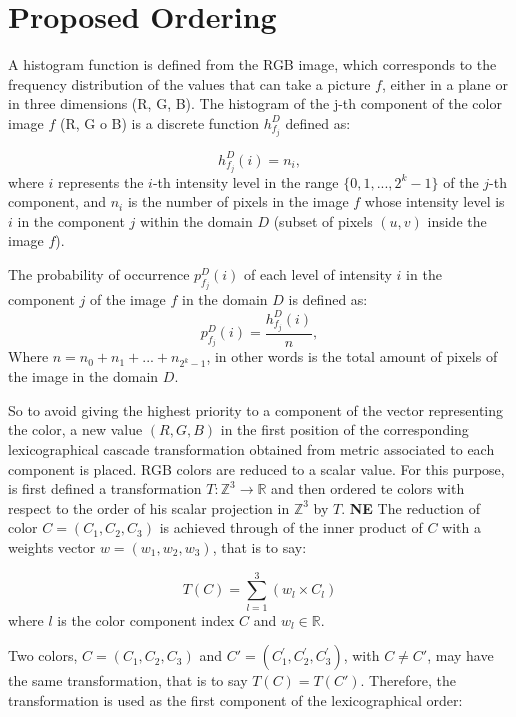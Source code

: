 \section{Proposed Ordering}
A histogram function is defined from the RGB image, which corresponds to the frequency distribution of the values that can take a picture $f$, either in a plane or in three dimensions (R, G, B). The histogram of the j-th component of the color image $f$ (R, G o B) is a discrete function $h_{f_j}^{D}$ defined as:%

\begin{equation}
\label{histograma}
   h_{f_j}^{D}(i) = n_i,
\end{equation} 
where ${i}$ represents the $i$-th intensity level in the range $\{0,1,...,2^k-1\}$ 
of the $j$-th component, and $n_i$ is the number of pixels in the image $f$ whose intensity level is $i$ in the component $j$ 
within the domain $D$ (subset of pixels $(u,v)$ inside the image $f$).

The probability of occurrence $p_{f_j}^{D}(i)$ of each level of intensity $i$ in the component $j$ of the image $f$ in the domain $D$ is defined as:
\begin{equation}
\label{probabilidad}
   p_{f_j}^{D}(i) = \frac{h_{f_j}^{D}(i)}{n},
\end{equation} Where $n = n_0 + n_1 + ... + n_{2^k-1}$, in other words is the total amount of pixels of the image in the domain $D$.

So to avoid giving the highest priority to a component of the vector representing the color, a new value $(R,G,B)$ in the first position of the corresponding lexicographical cascade transformation obtained from metric associated to each component is placed. 
RGB colors are reduced to a scalar value. For this purpose, is first defined a transformation $T:\mathbb{Z}^3 \rightarrow \mathbb{R}$ and then ordered te colors with respect to the order of his scalar projection in $\mathbb{Z}^3$ by $T$. \textbf{NE} %
The reduction of color $C=(C_1,C_2,C_3)$ is achieved through of the inner product of $C$ with a weights vector $w=(w_1,w_2,w_3) $, that is to say:

\begin{equation}
\label{Transformacion}
T(C)= \sum_{l=1}^3(w_l \times C_l)
\end{equation}  
where $l$ is the color component index $C$ and $w_l \in \mathbb{R}$. 

Two colors, $C=(C_1,C_2,C_3)$ and $C'=(C_1^{'},C_2^{'},C_3^{'})$, with $C\neq C'$, may have the same transformation, that is to say $T(C) = T(C')$.  Therefore, the transformation is used as the first component of the lexicographical order:

